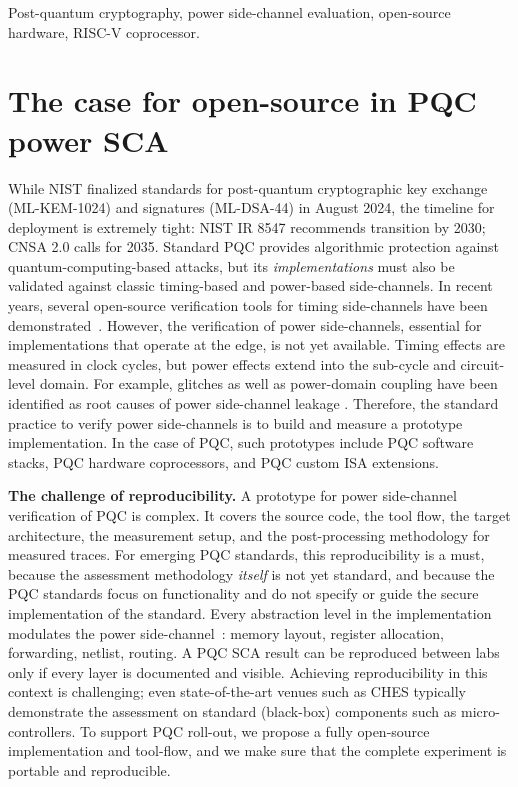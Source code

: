 \documentclass[10pt,conference]{IEEEtran}
\newcommand{\mlkem}{ML-KEM-1024\xspace}
\newcommand{\mldsa}{ML-DSA-44\xspace}
\begin{document}
\begin{IEEEkeywords}
Post-quantum cryptography, power side-channel evaluation, open-source hardware, RISC-V coprocessor.
\end{IEEEkeywords}

\section{The case for open-source in PQC power SCA}
\label{sec:intro}

While NIST finalized standards for post-quantum cryptographic key exchange (\mlkem) and signatures (\mldsa) in August 2024, the timeline for deployment is extremely tight: NIST IR 8547 recommends transition by 2030; CNSA 2.0 calls for 2035. Standard PQC provides algorithmic protection against quantum-computing-based attacks, but its {\em implementations} must also be validated against classic timing-based and power-based side-channels. In recent years, several open-source verification tools for timing side-channels have been demonstrated~\cite{hsiao_oscar,kastner_clepsydra}. However, the verification of power side-channels, essential for implementations that operate at the edge, is not yet available. Timing effects are measured in clock cycles, but power effects extend into the sub-cycle and circuit-level domain. For example, glitches as well as power-domain coupling have been identified as root causes of power side-channel leakage \cite{sen}. Therefore, the standard practice to verify power side-channels is to build and measure a prototype implementation. In the case of PQC, such prototypes include PQC software stacks, PQC hardware coprocessors, and PQC custom ISA extensions. 

\textbf{The challenge of reproducibility.} A prototype for power side-channel verification of PQC is complex. It covers the source code, the tool flow, the target architecture, the measurement setup, and the post-processing methodology for measured traces. For emerging PQC standards, this reproducibility is a must, because the assessment methodology {\em itself} is not yet standard, and because the PQC standards focus on functionality and do not specify or guide the secure implementation of the standard. 
Every abstraction level  in the implementation modulates the power side-channel~\cite{telescope}: memory layout, register allocation, forwarding, netlist, routing.
A PQC SCA result can be reproduced between labs only if every layer is documented and visible.
Achieving reproducibility in this context is challenging; even state-of-the-art venues such as CHES typically demonstrate the assessment on standard (black-box) components such as micro-controllers. To support PQC roll-out, we propose a fully open-source implementation and tool-flow, and we make sure that the complete experiment is portable and reproducible. 
\end{document}
